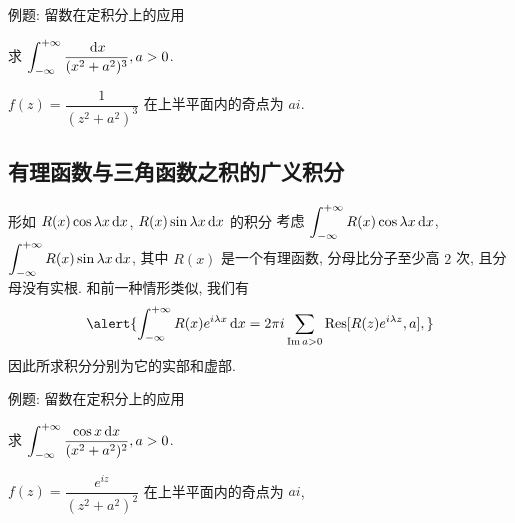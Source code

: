 \begin{frame}{例题: 留数在定积分上的应用\noexer}
	\onslide<+->
	\begin{example}
		求 $\displaystyle\int_{-\infty}^{+\infty}\frac{\,\mathrm{d} x}{(x^2+a^2)^3},a>0$.
	\end{example}

	\onslide<+->
	\begin{solution}
		$f(z)=\dfrac1{(z^2+a^2)^3}$ 在上半平面内的奇点为 $ai$.
		\vspace{-\baselineskip}
		\onslide<+->{故
			\[\int_{-\infty}^{+\infty}\frac{\diff x}{(x^2+a^2)^3}
		=2\pi i\Res[f(z),ai]=\frac{3\pi}{8a^5}.\]
		}
		\vspace{-\baselineskip}
	\end{solution}
\end{frame}


\subsection{有理函数与三角函数之积的广义积分}

\begin{frame}{形如 $R(x)\cos{\lambda x}\,\mathrm{d} x$,
	$R(x)\sin{\lambda x}\,\mathrm{d} x$ 的积分\noexer}
	\onslide<+->
	考虑 $\displaystyle\int_{-\infty}^{+\infty}R(x)\cos{\lambda x}\,\mathrm{d} x$,
	$\displaystyle\int_{-\infty}^{+\infty}R(x)\sin{\lambda x}\,\mathrm{d} x$, 其中 $R(x)$ 是一个有理函数, 分母比分子至少高 $2$ 次, 且分母没有实根.
	\onslide<+->
	和前一种情形类似, 我们有
	\[\alert{\int_{-\infty}^{+\infty}R(x)e^{i\lambda x}\diff x
	=2\pi i\sum_{\Im a>0}\Res[R(z)e^{i\lambda z},a],}\]
	\onslide<+->
	因此所求积分分别为它的实部和虚部.
\end{frame}


\begin{frame}{例题: 留数在定积分上的应用\noexer}
	\beqskip{2pt}
	\onslide<+->
	\begin{example}
		求 $\displaystyle\int_{-\infty}^{+\infty}\frac{\cos x\,\mathrm{d} x}{(x^2+a^2)^2}, a>0$.
	\end{example}

	\onslide<+->
	\begin{solution}
		$f(z)=\dfrac{e^{iz}}{(z^2+a^2)^2}$ 在上半平面内的奇点为 $ai$,
		\onslide<+->{
			\[\Res[f(z),ai]=\lim_{z\to ai}\left[\frac{e^{iz}}{(z+ai)^2}\right]'=-\frac{e^{-a}(a+1)i}{4a^3}.\]
		}\onslide<+->{
			\[\int_{-\infty}^{+\infty}\frac{\cos x\diff x}{(x^2+a^2)^2}=\frac{\pi e^{-a}(a+1)}{2a^3}.\]
		}
	\end{solution}
	\endgroup
\end{frame}


